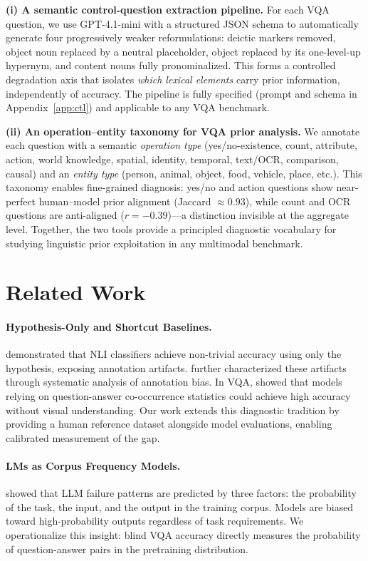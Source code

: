 \documentclass[letterpaper]{article}
\begin{document}
\textbf{(i) A semantic control-question extraction pipeline.} For each VQA
question, we use GPT-4.1-mini with a structured JSON schema to automatically
generate four progressively weaker reformulations: deictic markers removed,
object noun replaced by a neutral placeholder, object replaced by its one-level-up
hypernym, and content nouns fully pronominalized. This forms a controlled
degradation axis that isolates \emph{which lexical elements} carry prior information,
independently of accuracy. The pipeline is fully specified (prompt and schema in
Appendix~\ref{app:ctl}) and applicable to any VQA benchmark.

\textbf{(ii) An operation--entity taxonomy for VQA prior analysis.} We annotate
each question with a semantic \emph{operation type} (yes/no-existence, count,
attribute, action, world knowledge, spatial, identity, temporal, text/OCR,
comparison, causal) and an \emph{entity type} (person, animal, object, food,
vehicle, place, etc.). This taxonomy enables fine-grained diagnosis: yes/no and
action questions show near-perfect human--model prior alignment (Jaccard
$\approx 0.93$), while count and OCR questions are anti-aligned
($r = -0.39$)---a distinction invisible at the aggregate level.
Together, the two tools provide a principled diagnostic vocabulary for studying
linguistic prior exploitation in any multimodal benchmark.

\section{Related Work}

\paragraph{Hypothesis-Only and Shortcut Baselines.}
\citet{poliak2018hypothesis} demonstrated that NLI classifiers achieve
non-trivial accuracy using only the hypothesis, exposing annotation artifacts.
\citet{gururangan2018annotation} further characterized these artifacts through
systematic analysis of annotation bias. In VQA, \citet{agrawal2018dont} showed
that models relying on question-answer co-occurrence statistics could achieve
high accuracy without visual understanding. Our work extends this diagnostic
tradition by providing a human reference dataset alongside model evaluations,
enabling calibrated measurement of the gap.

\paragraph{LMs as Corpus Frequency Models.}
\citet{mccoy2024embers} showed that LLM failure patterns are predicted by three
factors: the probability of the task, the input, and the output in the training
corpus. Models are biased toward high-probability outputs regardless of task
requirements. We operationalize this insight: blind VQA accuracy directly
measures the probability of question-answer pairs in the pretraining distribution.
\end{document}
